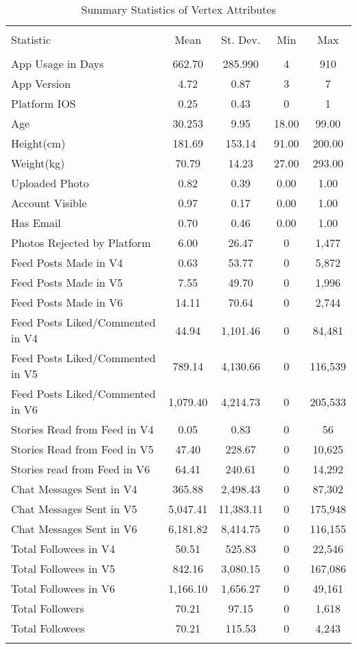 \begin{table}[!htbp] \centering
  \caption{Summary Statistics of Vertex Attributes}
\begin{tabular}{lcccc}
\\[-1.8ex]\hline  \hline \\[-1.8ex]
Statistic & \multicolumn{1}{c}{Mean} & \multicolumn{1}{c}{St. Dev.} & \multicolumn{1}{c}{Min} & \multicolumn{1}{c}{Max} \\
\hline \\[-1.8ex]
App Usage in Days & 662.70 & 285.990 & 4 & 910 \\
App Version & 4.72 & 0.87 & 3 & 7 \\
Platform IOS & 0.25 & 0.43 & 0 & 1 \\
Age & 30.253 & 9.95 & 18.00 & 99.00 \\
Height(cm) & 181.69 & 153.14 & 91.00 & 200.00 \\
Weight(kg) & 70.79 & 14.23 & 27.00 & 293.00 \\
Uploaded Photo & 0.82 & 0.39 & 0.00 & 1.00 \\
Account Visible & 0.97 & 0.17 & 0.00 & 1.00 \\
Has Email & 0.70 & 0.46 & 0.00 & 1.00 \\
Photos Rejected by Platform & 6.00 & 26.47 & 0 & 1,477 \\
Feed Posts Made in V4 & 0.63 & 53.77 & 0 & 5,872 \\
Feed Posts Made in V5 & 7.55 & 49.70 & 0 & 1,996 \\
Feed Posts Made in V6 & 14.11 & 70.64 & 0 & 2,744 \\
Feed Posts Liked/Commented in V4 & 44.94 & 1,101.46 & 0 & 84,481 \\
Feed Posts Liked/Commented in V5 & 789.14 & 4,130.66 & 0 & 116,539 \\
Feed Posts Liked/Commented in V6 & 1,079.40 & 4,214.73 & 0 & 205,533 \\
Stories Read from Feed in V4 & 0.05 & 0.83 & 0 & 56 \\
Stories Read from Feed in V5 & 47.40 & 228.67 & 0 & 10,625 \\
Stories read from Feed in V6 & 64.41 & 240.61 & 0 & 14,292 \\
Chat Messages Sent in V4 & 365.88 & 2,498.43 & 0 & 87,302 \\
Chat Messages Sent in V5 & 5,047.41 & 11,383.11 & 0 & 175,948 \\
Chat Messages Sent in V6 & 6,181.82 & 8,414.75 & 0 & 116,155 \\
Total Followees in V4 & 50.51 & 525.83 & 0 & 22,546 \\
Total Followees in V5 & 842.16 & 3,080.15 & 0 & 167,086 \\
Total Followees in V6 & 1,166.10 & 1,656.27 & 0 & 49,161 \\
Total Followers & 70.21 & 97.15 & 0 & 1,618 \\
Total Followees & 70.21 & 115.53 & 0 & 4,243 \\
\hline \hline \\[-1.8ex]
\end{tabular}
\end{table}

